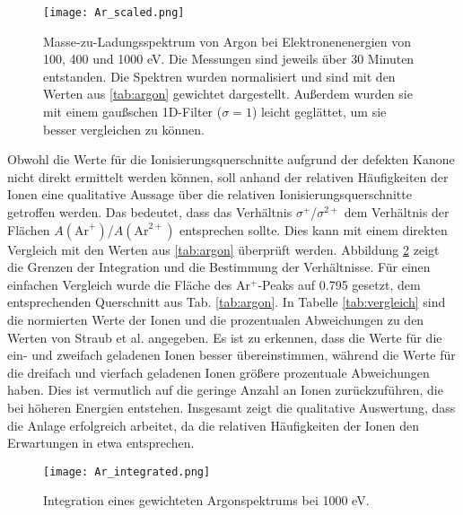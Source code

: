 \begin{landscape}
    \begin{figure}
        \centering
        \hspace*{-3cm}\texttt{[image: Ar\_scaled.png]}
        \caption[Skaliertes Massenspektrum von Argon bei verschiedenen Elektronenenergien]{Masse-zu-Ladungsspektrum von Argon bei Elektronenenergien von 100, 400 und 1000 eV. Die Messungen sind jeweils über 30 Minuten entstanden. Die Spektren wurden normalisiert und sind mit den Werten aus \ref{tab:argon} gewichtet dargestellt. Außerdem wurden sie mit einem gaußschen 1D-Filter ($\sigma = 1$) leicht geglättet, um sie besser vergleichen zu können.}
        \label{fig:ar_scaled}
    \end{figure}
\end{landscape}

Obwohl die Werte für die Ionisierungsquerschnitte aufgrund der defekten Kanone nicht direkt ermittelt werden können, soll anhand der relativen Häufigkeiten der Ionen eine qualitative Aussage über die relativen Ionisierungsquerschnitte getroffen werden. Das bedeutet, dass das Verhältnis $\sigma^+$/$\sigma^{2+}$ dem Verhältnis der Flächen $A(\text{Ar}^+)$/$A(\text{Ar}^{2+})$ entsprechen sollte. Dies kann mit einem direkten Vergleich  mit den Werten aus \ref{tab:argon} überprüft werden. Abbildung \ref{fig:ar_ratio} zeigt die Grenzen der Integration und die Bestimmung der Verhältnisse. Für einen einfachen Vergleich wurde die Fläche des Ar$^+$-Peaks auf 0.795 gesetzt, dem entsprechenden Querschnitt aus Tab. \ref{tab:argon}. In Tabelle \ref{tab:vergleich} sind die normierten Werte der Ionen und die prozentualen Abweichungen zu den Werten von Straub et al. \cite{Straub} angegeben. Es ist zu erkennen, dass die Werte für die ein- und zweifach geladenen Ionen besser übereinstimmen, während die Werte für die dreifach und vierfach geladenen Ionen größere prozentuale Abweichungen haben. Dies ist vermutlich auf die geringe Anzahl an Ionen zurückzuführen, die bei höheren Energien entstehen. Insgesamt zeigt die qualitative Auswertung, dass die Anlage erfolgreich arbeitet, da die relativen Häufigkeiten der Ionen den Erwartungen in etwa entsprechen. 

\begin{figure}
    \centering
    \texttt{[image: Ar\_integrated.png]}
    \caption[Integration eines gewichteten Argonspektrums bei 1000 eV]{Integration eines gewichteten Argonspektrums bei 1000 eV.}
    \label{fig:ar_ratio}
\end{figure}

